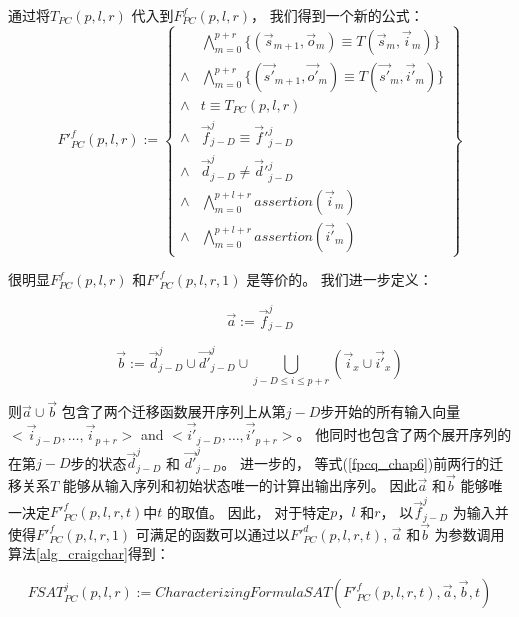 通过将$T_{PC}(p,l,r)$ 代入到$F^f_{PC}(p,l,r)$，
我们得到一个新的公式：
\begin{equation}\label{fpcq_chap6}
F'^f_{PC}(p,l,r):=
\left\{
\begin{array}{cc}
&\bigwedge_{m=0}^{p+r}
\{
(\vec{s}_{m+1},\vec{o}_m)\equiv T(\vec{s}_m,\vec{i}_m)
\}
\\
\wedge&\bigwedge_{m=0}^{p+r}
\{
(\vec{s'}_{m+1},\vec{o'}_m)\equiv T(\vec{s'}_m,\vec{i'}_m)
\}
\\
\wedge& t\equiv T_{PC}(p,l,r)\\
\wedge& \vec{f}^j_{j-D}\equiv \vec{f}'^j_{j-D} \\
\wedge& \vec{d}^j_{j-D}\ne \vec{d}'^j_{j-D} \\
\wedge&\bigwedge_{m=0}^{p+l+r}assertion(\vec{i}_m) \\
\wedge&\bigwedge_{m=0}^{p+l+r}assertion(\vec{i'}_m)
\end{array}
\right\}
\end{equation}


很明显$F^f_{PC}(p,l,r)$ 和$F'^f_{PC}(p,l,r,1)$ 是等价的。
我们进一步定义：

\begin{equation}\label{pcdef1_chap6}
\vec{a}:=\vec{f}^j_{j-D}
\end{equation}

\begin{equation}\label{pcdef2_chap6}
\vec{b}:=\vec{d}^j_{j-D}\cup \vec{d'}^j_{j-D}\cup \bigcup_{j-D\le i\le p+r}(\vec{i}_{x}\cup\vec{i'}_{x})
\end{equation}

则$\vec{a}\cup\vec{b}$ 包含了两个迁移函数展开序列上从第$j-D$步开始的所有输入向量$<\vec{i}_{j-D},\dots,\vec{i}_{p+r}>$ and $<\vec{i'}_{j-D},\dots,\vec{i'}_{p+r}>$。
他同时也包含了两个展开序列的在第$j-D$步的状态$\vec{d}^j_{j-D}$ 和 $\vec{d'}^j_{j-D}$。
进一步的，
等式(\ref{fpcq_chap6})前两行的迁移关系$T$
能够从输入序列和初始状态唯一的计算出输出序列。
因此$\vec{a}$ 和$\vec{b}$ 能够唯一决定$F'^f_{PC}(p,l,r,t)$中$t$ 的取值。
因此，
对于特定$p$，$l$ 和$r$，
以$\vec{f}^j_{j-D}$ 为输入并使得$F'^f_{PC}(p,l,r,1)$ 可满足的函数可以通过以$F'^d_{PC}(p,l,r,t)$, $\vec{a}$ 和$\vec{b}$ 为参数调用算法\ref{alg_craigchar}得到：

\begin{equation}\label{fsat_pc_chap6}
FSAT^j_{PC}(p,l,r):=CharacterizingFormulaSAT(F'^f_{PC}(p,l,r,t),\vec{a},\vec{b},t)
\end{equation}

